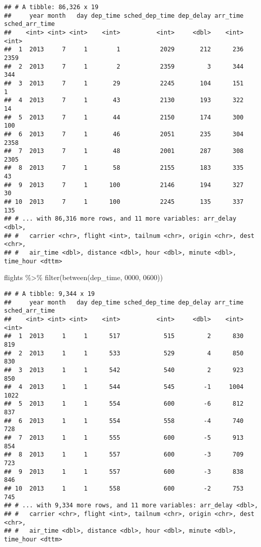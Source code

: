 \documentclass[
]{article}
\newenvironment{Shaded}{\begin{snugshade}}{\end{snugshade}}
\newcommand{\DecValTok}[1]{\textcolor[rgb]{0.00,0.00,0.81}{#1}}
\newcommand{\FunctionTok}[1]{\textcolor[rgb]{0.00,0.00,0.00}{#1}}
\newcommand{\NormalTok}[1]{#1}
\newcommand{\SpecialCharTok}[1]{\textcolor[rgb]{0.00,0.00,0.00}{#1}}
\begin{document}
\begin{verbatim}
## # A tibble: 86,326 x 19
##     year month   day dep_time sched_dep_time dep_delay arr_time sched_arr_time
##    <int> <int> <int>    <int>          <int>     <dbl>    <int>          <int>
##  1  2013     7     1        1           2029       212      236           2359
##  2  2013     7     1        2           2359         3      344            344
##  3  2013     7     1       29           2245       104      151              1
##  4  2013     7     1       43           2130       193      322             14
##  5  2013     7     1       44           2150       174      300            100
##  6  2013     7     1       46           2051       235      304           2358
##  7  2013     7     1       48           2001       287      308           2305
##  8  2013     7     1       58           2155       183      335             43
##  9  2013     7     1      100           2146       194      327             30
## 10  2013     7     1      100           2245       135      337            135
## # ... with 86,316 more rows, and 11 more variables: arr_delay <dbl>,
## #   carrier <chr>, flight <int>, tailnum <chr>, origin <chr>, dest <chr>,
## #   air_time <dbl>, distance <dbl>, hour <dbl>, minute <dbl>, time_hour <dttm>
\end{verbatim}

\begin{Shaded}
\begin{Highlighting}[]
\NormalTok{flights }\SpecialCharTok{\%\textgreater{}\%} \FunctionTok{filter}\NormalTok{(}\FunctionTok{between}\NormalTok{(dep\_time, }\DecValTok{0000}\NormalTok{, }\DecValTok{0600}\NormalTok{))}
\end{Highlighting}
\end{Shaded}

\begin{verbatim}
## # A tibble: 9,344 x 19
##     year month   day dep_time sched_dep_time dep_delay arr_time sched_arr_time
##    <int> <int> <int>    <int>          <int>     <dbl>    <int>          <int>
##  1  2013     1     1      517            515         2      830            819
##  2  2013     1     1      533            529         4      850            830
##  3  2013     1     1      542            540         2      923            850
##  4  2013     1     1      544            545        -1     1004           1022
##  5  2013     1     1      554            600        -6      812            837
##  6  2013     1     1      554            558        -4      740            728
##  7  2013     1     1      555            600        -5      913            854
##  8  2013     1     1      557            600        -3      709            723
##  9  2013     1     1      557            600        -3      838            846
## 10  2013     1     1      558            600        -2      753            745
## # ... with 9,334 more rows, and 11 more variables: arr_delay <dbl>,
## #   carrier <chr>, flight <int>, tailnum <chr>, origin <chr>, dest <chr>,
## #   air_time <dbl>, distance <dbl>, hour <dbl>, minute <dbl>, time_hour <dttm>
\end{verbatim}
\end{document}
